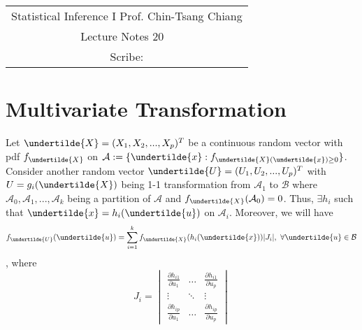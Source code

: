 \documentclass[../MultivariateProbabilityAndRelatedProperties.tex]{subfiles}
\begin{document}
	\begin{center}
		\renewcommand{\arraystretch}{2}
		\begin{bfseries}
			\begin{tabular}{|c|}
				\hline
				Statistical Inference I \hfill Prof. Chin-Tsang Chiang\\
				\hspace{15em} {\large Lecture Notes 20} \hspace{15em}\ \\
				\lecdate \hfill Scribe: \scribe\\
				\hline
			\end{tabular}
			\renewcommand{\arraystretch}{1}
		\end{bfseries}
	\end{center}

\section{Multivariate Transformation}
Let $\undertilde{X} = (X_1,X_2,...,X_p)^T$ be a continuous random vector with pdf $f_{\undertilde{X}}$ on $\mathcal{A}:=\{\undertilde{x}:f_{\undertilde{X}(\undertilde{x})\geq0} \}$. Consider another random vector $\undertilde{U} = (U_1,U_2,...,U_p)^T$ with $U = g_i(\undertilde{X})$ being 1-1 transformation from $\mathcal{A}_1$ to $\mathcal{B}$ where $\mathcal{A}_0,\mathcal{A}_1,...,\mathcal{A}_k$ being a partition of $\mathcal{A}$ and $f_{\undertilde{X}}(\mathcal{A}_0)=0$. Thus, $\exists h_i$ such that $\undertilde{x} = h_i(\undertilde{u})$  on $\mathcal{A}_i$. Moreover, we will have
$$f_{\undertilde{U}}(\undertilde{u}) = \sum_{i=1}^k f_{\undertilde{X}}(h_i(\undertilde{x}))|J_i|,\ \forall \undertilde{u}\in\mathcal{B}$$
, where \[
J_i =
\begin{vmatrix}
\frac{\partial h_{i1}}{\partial u_1} & \dots & \frac{\partial h_{i1}}{\partial u_p}\\
\vdots&\ddots&\vdots\\
\frac{\partial h_{ip}}{\partial u_1}&\dots&\frac{\partial h_{ip}}{\partial u_p}
\end{vmatrix}
\]
\end{document}

